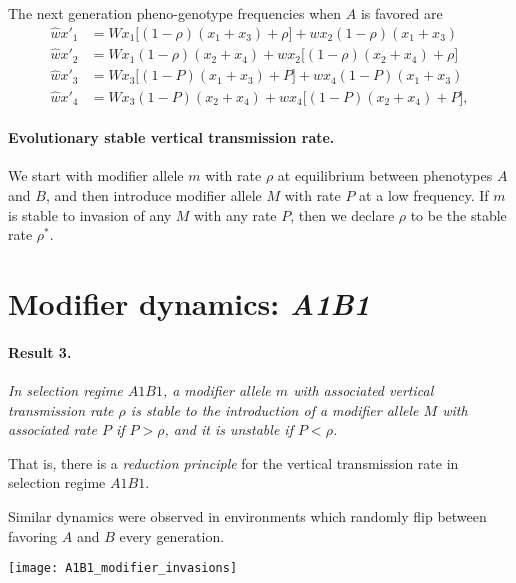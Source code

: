 \documentclass[a0,landscape]{a0poster}
\begin{document}
\begin{multicols}{4}
The next generation pheno-genotype frequencies when $A$ is favored are
\begin{equation}
\begin{aligned}
\hat{w}x'_1 &= W x_1\bigl[(1-\rho)(x_1+x_3) +\rho\bigr] + w x_2(1-\rho)(x_1+x_3)\\
\hat{w}x'_2 &= W x_1(1-\rho)(x_2+x_4) + w x_2\bigl[(1-\rho)(x_2+x_4)+\rho\bigr]\\ 
\hat{w}x'_3 &= W x_3\bigl[(1-P)(x_1+x_3) +P\bigr] + w x_4(1-P)(x_1+x_3)\\
\hat{w}x'_4 &= W x_3(1-P)(x_2+x_4) + w x_4\bigl[(1-P)(x_2+x_4)+P\bigr], 
\end{aligned}
\end{equation}

\paragraph{Evolutionary stable vertical transmission rate.}
We start with modifier allele $m$ with rate $\rho$ at equilibrium between phenotypes $A$ and $B$, and then introduce modifier allele $M$ with rate $P$ at a low frequency.
If $m$ is stable to invasion of any $M$ with any rate $P$, then we declare $\rho$ to be the stable rate $\rho^*$.

\columnbreak

\section*{Modifier dynamics: \emph{A1B1}}

\paragraph*{Result 3.}\textit{In selection regime $A1B1$, a modifier allele $m$ with associated vertical transmission rate $\rho$ is stable to the introduction of a modifier allele $M$ with associated rate $P$ if $P>\rho$, and it is unstable if $P<\rho$.
}

That is, there is a \emph{reduction principle} for the vertical transmission rate in selection regime $A1B1$.

Similar dynamics were observed in environments which randomly flip between favoring $A$ and $B$ every generation.


\begin{center}\vspace{1cm}
\texttt{[image: A1B1\_modifier\_invasions]}
\end{center}\vspace{1cm}


\end{multicols}
\end{document}
